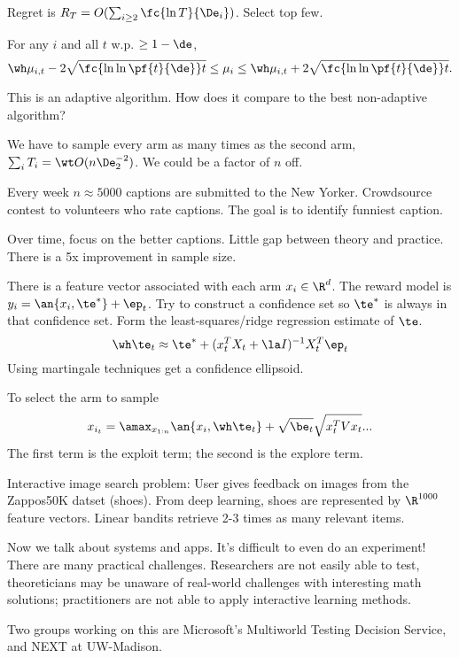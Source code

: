 Regret is $R_T = O(\sum_{i\ge 2} \fc{\ln T}{\De_i})$. Select top few. %

For any $i$ and all $t$ w.p. $\ge 1-\de$,
$$ \wh \mu_{i,t} - 2\sqrt{\fc{\ln \ln \pf{t}{\de}}t}\le \mu_i \le \wh \mu_{i,t} + 2\sqrt{\fc{\ln \ln \pf{t}{\de}}t}.$$


This is an adaptive algorithm. How does it compare to the best non-adaptive algorithm?

We have to sample every arm as many times as the second arm, $\sum_i T_i = \wt O(n\De_2^{-2})$. We could be a factor of $n$ off.

Every week $n\approx 5000$ captions are submitted to the New Yorker. Crowdsource contest to volunteers who rate captions. The goal is to identify funniest caption. 

Over time, focus on the better captions. Little gap between theory and practice. There is a 5x improvement in sample size.

There is a feature vector associated with each arm $x_i\in \R^d$. The reward model is $y_i = \an{x_i, \te^*}+\ep_t$. %
Try to construct a confidence set so $\te^*$ is always in that confidence set. Form the least-squares/ridge regression estimate of $\te$.
$$
\wh \te_t \approx \te^* + (x_t^TX_t+\la I)^{-1} X_t^T\ep_t
$$
Using martingale techniques get a confidence ellipsoid.

To select the arm to sample
$$
x_{i_t} = \amax_{x_{1:n}} \an{x_i,\wh \te_t} + \sqrt{\be_t}\sqrt{x_t^TVx_t}...
$$
The first term is the exploit term; the second is the explore term.

Interactive image search problem: User gives feedback on images from the  Zappos50K datset (shoes). From deep learning, shoes are represented by $\R^{1000}$ feature vectors.  Linear bandits retrieve 2-3 times as many relevant items.

Now we talk about systems and apps. It's difficult to even do an experiment!
There are many practical challenges. 
Researchers are not easily able to test, theoreticians may be unaware of real-world challenges with interesting math solutions; practitioners are not able to apply interactive learning methods.

Two groups working on this are Microsoft's Multiworld Testing Decision Service, and NEXT at UW-Madison.


